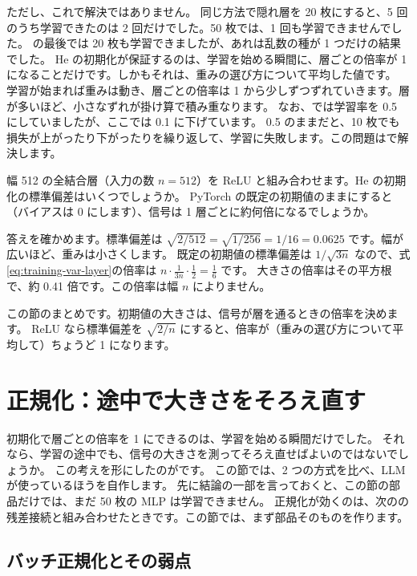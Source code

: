 ただし、これで解決ではありません。
同じ方法で隠れ層を 20 枚にすると、5 回のうち学習できたのは 2 回だけでした。50 枚では、1 回も学習できませんでした。
の最後では 20 枚も学習できましたが、あれは乱数の種が 1 つだけの結果でした。
He の初期化が保証するのは、学習を始める瞬間に、層ごとの倍率が 1 になることだけです。しかもそれは、重みの選び方について平均した値です。
学習が始まれば重みは動き、層ごとの倍率は 1 から少しずつずれていきます。層が多いほど、小さなずれが掛け算で積み重なります。
なお、では学習率を 0.5 にしていましたが、ここでは 0.1 に下げています。
0.5 のままだと、10 枚でも損失が上がったり下がったりを繰り返して、学習に失敗します。この問題はで解決します。

\begin{quiz}
幅 512 の全結合層（入力の数 $n=512$）を ReLU と組み合わせます。He の初期化の標準偏差はいくつでしょうか。
PyTorch の既定の初期値のままにすると（バイアスは 0 にします）、信号は 1 層ごとに約何倍になるでしょうか。
\end{quiz}

答えを確かめます。標準偏差は $\sqrt{2/512}=\sqrt{1/256}=1/16=0.0625$ です。幅が広いほど、重みは小さくします。
既定の初期値の標準偏差は $1/\sqrt{3n}$ なので、式\eqref{eq:training-var-layer}の倍率は $n\cdot\frac{1}{3n}\cdot\frac{1}{2}=\frac{1}{6}$ です。
大きさの倍率はその平方根で、約 0.41 倍です。この倍率は幅 $n$ によりません。

この節のまとめです。初期値の大きさは、信号が層を通るときの倍率を決めます。
ReLU なら標準偏差を $\sqrt{2/n}$ にすると、倍率が（重みの選び方について平均して）ちょうど 1 になります。

\section{正規化：途中で大きさをそろえ直す}\label{sec:training-norm}

初期化で層ごとの倍率を 1 にできるのは、学習を始める瞬間だけでした。
それなら、学習の途中でも、信号の大きさを測ってそろえ直せばよいのではないでしょうか。
この考えを形にしたのがです。
この節では、2 つの方式を比べ、LLM が使っているほうを自作します。
先に結論の一部を言っておくと、この節の部品だけでは、まだ 50 枚の MLP は学習できません。
正規化が効くのは、次のの残差接続と組み合わせたときです。この節では、まず部品そのものを作ります。

\subsection*{バッチ正規化とその弱点}

